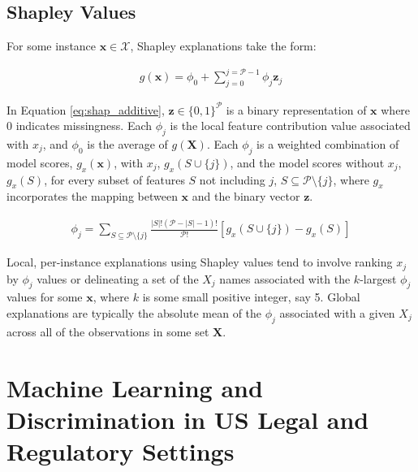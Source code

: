 \documentclass[information,article,submit,moreauthors,pdftex]{definitions/mdpi}
\begin{document}
\subsection{Shapley Values}\label{a_ssec:shap}

For some instance $\mathbf{x} \in \mathcal{X}$, Shapley explanations take the form: 

\begin{equation}
\label{eq:shap_additive}
\begin{aligned}
g(\mathbf{x}) = \phi_0 + \sum_{j=0}^{j=\mathcal{P} - 1} \phi_j \mathbf{z}_j
\end{aligned}
\end{equation}

\noindent In Equation \ref{eq:shap_additive}, $\mathbf{z} \in \{0,1\}^\mathcal{P}$ is a binary representation of $\mathbf{x}$ where 0 indicates missingness. Each $\phi_j$ is the local feature contribution value associated with $x_j$, and $\phi_0$ is the average of $g(\mathbf{X})$. Each $\phi_j$ is a weighted combination of model scores, $g_x(\mathbf{x})$, with $x_j$, $g_x(S \cup \{j\})$, and the model scores without $x_j$, $g_x(S)$, for every subset of features $S$ not including $j$, $S \subseteq \mathcal{P} \setminus \{j\}$, where $g_x$ incorporates the mapping between $\mathbf{x}$ and the binary vector $\mathbf{z}$. 

\begin{equation}
\label{eq:shap_contrib}
\begin{aligned}
\phi_{j} = \sum_{S \subseteq \mathcal{P} \setminus \{j\}}\frac{|S|!(\mathcal{P} -|S| -1)!}{\mathcal{P}!}[g_x(S \cup \{j\}) - g_x(S)]
\end{aligned}
\end{equation}

\noindent Local, per-instance explanations using Shapley values tend to involve ranking $x_j$ by $\phi_j$ values or delineating a set of the $X_j$ names associated with the $k$-largest $\phi_j$ values for some $\mathbf{x}$, where $k$ is some small positive integer, say 5. Global explanations are typically the absolute mean of the $\phi_j$ associated with a given $X_j$ across all of the observations in some set $\mathbf{X}$.

\section{Machine Learning and Discrimination in US Legal and Regulatory Settings}\label{a_sec:types}
\end{document}
